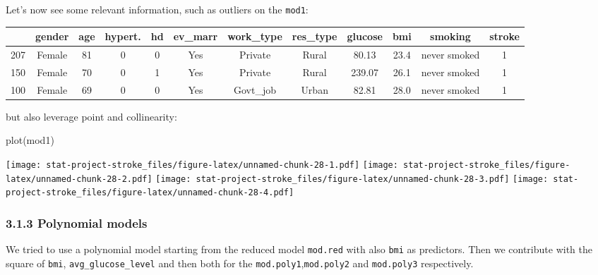 \documentclass[
]{article}
\newenvironment{Shaded}{\begin{snugshade}}{\end{snugshade}}
\newcommand{\FunctionTok}[1]{\textcolor[rgb]{0.00,0.00,0.00}{#1}}
\newcommand{\NormalTok}[1]{#1}
\begin{document}
Let's now see some relevant information, such as outliers on the
\texttt{mod1}:

\begin{longtable}[]{@{}lccccccccccc@{}}
\toprule
& gender & age & hypert. & hd & ev\_marr & work\_type & res\_type &
glucose & bmi & smoking & stroke \\
\midrule
\endhead
207 & Female & 81 & 0 & 0 & Yes & Private & Rural & 80.13 & 23.4 & never
smoked & 1 \\
150 & Female & 70 & 0 & 1 & Yes & Private & Rural & 239.07 & 26.1 &
never smoked & 1 \\
100 & Female & 69 & 0 & 0 & Yes & Govt\_job & Urban & 82.81 & 28.0 &
never smoked & 1 \\
\bottomrule
\end{longtable}

but also leverage point and collinearity:

\begin{Shaded}
\begin{Highlighting}[]
\FunctionTok{plot}\NormalTok{(mod1)}
\end{Highlighting}
\end{Shaded}

\texttt{[image: stat-project-stroke\_files/figure-latex/unnamed-chunk-28-1.pdf]}
\texttt{[image: stat-project-stroke\_files/figure-latex/unnamed-chunk-28-2.pdf]}
\texttt{[image: stat-project-stroke\_files/figure-latex/unnamed-chunk-28-3.pdf]}
\texttt{[image: stat-project-stroke\_files/figure-latex/unnamed-chunk-28-4.pdf]}

\hypertarget{polynomial-models}{%
\subsubsection{3.1.3 Polynomial models}\label{polynomial-models}}

We tried to use a polynomial model starting from the reduced model
\texttt{mod.red} with also \texttt{bmi} as predictors. Then we
contribute with the square of \texttt{bmi}, \texttt{avg\_glucose\_level}
and then both for the \texttt{mod.poly1},\texttt{mod.poly2} and
\texttt{mod.poly3} respectively.
\end{document}
